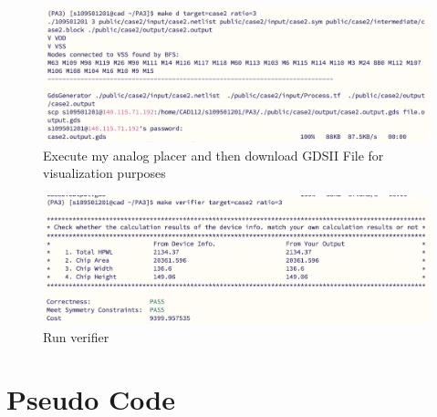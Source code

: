 \documentclass{article}
\begin{document}
\vspace*{-1em}

\begin{figure}[H]
  \centering
  \includegraphics[width=\linewidth]{./img/2024-05-26-19-12-58.png}
  \caption{Execute my analog placer and then download GDSII File for visualization purposes}
  \label{gdsii}
\end{figure}


\begin{figure}[H]
    \centering
    \includegraphics[width=\linewidth]{./img/2024-05-26-19-15-10.png}
    \caption{Run verifier}
    \label{verifier}
  \end{figure}

\pagebreak

\section{Pseudo Code}
\end{document}

